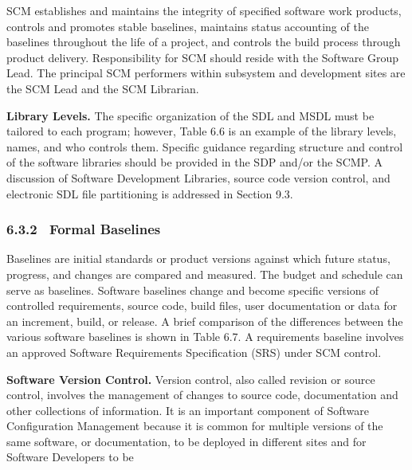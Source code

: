 \documentclass[10pt,twocolumn]{article}
\begin{document}
SCM establishes and maintains the integrity of specified
software work products, controls and promotes stable baselines, maintains status accounting of the baselines throughout the life of a project, and controls the build process
through product delivery. Responsibility for SCM should
reside with the Software Group Lead. The principal SCM
performers within subsystem and development sites are the
SCM Lead and the SCM Librarian.


\textbf{Library Levels.} The specific organization of the SDL and
MSDL must be tailored to each program; however, Table 6.6 is
an example of the library levels, names, and who controls them.
Specific guidance regarding structure and control of the
software libraries should be provided in the SDP and/or the
SCMP. A discussion of Software Development Libraries,
source code version control, and electronic SDL file partitioning is addressed in Section 9.3.



\subsubsection*{6.3.2 $\,$ Formal Baselines}
Baselines are initial standards or product versions against
which future status, progress, and changes are compared and
measured. The budget and schedule can serve as baselines.
Software baselines change and become specific versions of
controlled requirements, source code, build files, user documentation or data for an increment, build, or release. A brief
comparison of the differences between the various software
baselines is shown in Table 6.7. A requirements baseline
involves an approved Software Requirements Specification
(SRS) under SCM control.



\textbf{Software Version Control.} Version control, also called
revision or source control, involves the management of
changes to source code, documentation and other collections
of information. It is an important component of Software
Configuration Management because it is common for multiple versions of the same software, or documentation, to be
deployed in different sites and for Software Developers to be
\end{document}
